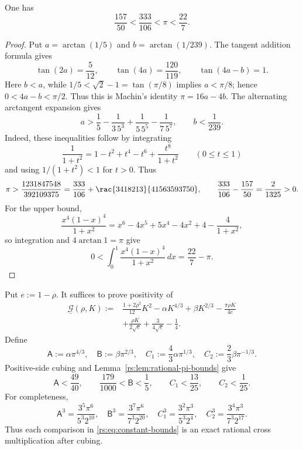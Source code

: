 \begin{lemma}
\label{rs:lem:rational-pi-bounds}
One has
\[
 \frac{157}{50}<\frac{333}{106}<\pi<\frac{22}{7}.
\]
\end{lemma}

\begin{proof}
Put $a=\arctan(1/5)$ and $b=\arctan(1/239)$.  The tangent addition
formula gives
\[
 \tan(2a)=\frac5{12},\qquad
 \tan(4a)=\frac{120}{119},\qquad
 \tan(4a-b)=1.
\]
Here $b<a$, while
$1/5<\sqrt2-1=\tan(\pi/8)$ implies $a<\pi/8$; hence
$0<4a-b<\pi/2$.  Thus this is Machin's identity
$\pi=16a-4b$.  The alternating arctangent expansion gives
\[
 a>\frac15-\frac1{3\,5^3}+\frac1{5\,5^5}-\frac1{7\,5^7},
 \qquad b<\frac1{239}.
\]
Indeed, these inequalities follow by integrating
\[
 \frac1{1+t^2}=1-t^2+t^4-t^6+\frac{t^8}{1+t^2}
 \qquad(0\leq t\leq1)
\]
and using $1/(1+t^2)<1$ for $t>0$.
Thus
\[
 \pi>
 \frac{1231847548}{392109375}
 =\frac{333}{106}+\rac{3418213}{41563593750},
 \qquad
 \frac{333}{106}-\frac{157}{50}=\frac2{1325}>0.
\]
For the upper bound,
\[
 \frac{x^4(1-x)^4}{1+x^2}
 =x^6-4x^5+5x^4-4x^2+4-\frac4{1+x^2},
\]
so integration and $4\arctan1=\pi$ give
\[
 0<\int_0^1\frac{x^4(1-x)^4}{1+x^2}\,dx
 =\frac{22}{7}-\pi.
\]
\end{proof}

Put $e:=1-\rho$.  It suffices to prove positivity of
\begin{equation}
 \begin{aligned}
 \underline{\mathcal G}(\rho,K):={}&
 \frac{1+2\rho^2}{12}K^2
 -\alpha K^{4/3}+\beta K^{2/3}
 -\frac{\pi\rho K}{4e}\\
 &+\frac{\rho K}{2\sqrt e}
 +\frac3{4\sqrt e}-\frac14.
 \end{aligned}
 \label{rs:eq:G-under}
\end{equation}
Define
\begin{equation}
 \mathsf A:=\alpha\pi^{4/3},
 \quad \mathsf B:=\beta\pi^{2/3},
 \quad C_1:=\frac43\alpha\pi^{1/3},
 \quad C_2:=\frac23\beta\pi^{-1/3}.
 \label{rs:eq:scaled-constants}
\end{equation}
Positive-side cubing and Lemma~\ref{rs:lem:rational-pi-bounds} give
\begin{equation}
 \mathsf A<\frac{49}{40},
 \qquad
 \frac{179}{1000}<\mathsf B<\frac15,
 \qquad
 C_1<\frac{13}{25},
 \qquad
 C_2<\frac1{25}.
 \label{rs:eq:constant-bounds}
\end{equation}
For completeness,
\begin{equation}
 \mathsf A^3=\frac{3^5\pi^6}{5^3 2^{10}},
 \quad
 \mathsf B^3=\frac{3^7\pi^6}{7^3 2^{20}},
 \quad
 C_1^3=\frac{3^2\pi^3}{5^3 2^4},
 \quad
 C_2^3=\frac{3^4\pi^3}{7^3 2^{17}}.
 \label{rs:eq:constant-cubes}
\end{equation}
Thus each comparison in \eqref{rs:eq:constant-bounds} is an exact rational
cross multiplication after cubing.

